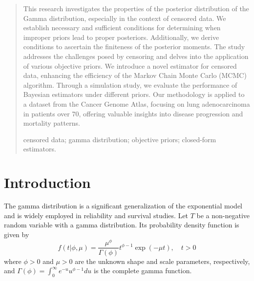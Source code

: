 \documentclass[12pt]{article} %
\theoremstyle{plain}%
\theoremstyle{definition}
\theoremstyle{remark}
\begin{document}
\begin{quotation}
This research investigates the properties of the posterior distribution of the Gamma distribution, especially in the context of censored data. We establish necessary and sufficient conditions for determining when improper priors lead to proper posteriors. Additionally, we derive conditions to ascertain the finiteness of the posterior moments. The study addresses the challenges posed by censoring and delves into the application of various objective priors. We introduce a novel estimator for censored data, enhancing the efficiency of the Markov Chain Monte Carlo (MCMC) algorithm. Through a simulation study, we evaluate the performance of Bayesian estimators under different priors. Our methodology is applied to a dataset from the Cancer Genome Atlas, focusing on lung adenocarcinoma in patients over 70, offering valuable insights into disease progression and mortality patterns.
 \par

\vspace{9pt}
censored data; gamma distribution; objective priors; closed-form estimators.
\par
\end{quotation}\par



\def\thefigure{\arabic{figure}}
\def\thetable{\arabic{table}}

\renewcommand{\theequation}{\thesection.\arabic{equation}}


\fontsize{12}{14pt plus.8pt minus .6pt}\selectfont

\setcounter{section}{0} %
\setcounter{equation}{0} %
\section{Introduction}



The gamma distribution is a significant generalization of the exponential model and is widely employed in reliability and survival studies. Let $T$ be a non-negative random variable with a gamma distribution. Its probability density function is given by
\begin{equation*}%
f(t|\phi,\mu)= \frac{\mu^\phi}{\Gamma(\phi)}t^{\phi-1}\exp(-\mu t) ,\quad t>0
\end{equation*}
where $\phi>0$ and $\mu>0$ are the unknown shape and scale parameters, respectively, and $\Gamma(\phi)=\int_{0}^{\infty}{e^{-u}u^{\phi-1}du}$ is the complete gamma function. 
\end{document}
